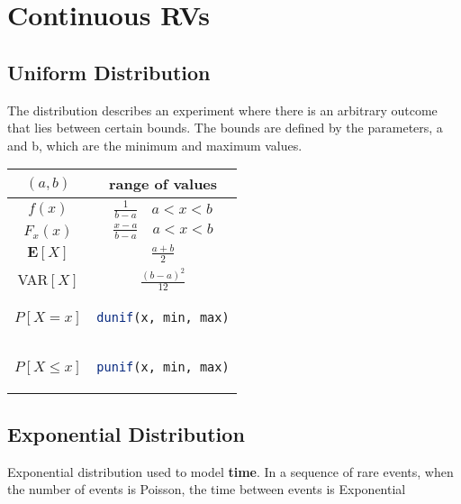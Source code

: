 \chapter{Continuous RVs}
\section{Uniform Distribution}
\begin{tcolorbox}
The distribution describes an experiment where there is an arbitrary outcome that lies between certain bounds. The bounds are defined by the parameters, a and b, which are the minimum and maximum values.
\end{tcolorbox}

\begingroup
\setlength{\tabcolsep}{10pt} %
\renewcommand{\arraystretch}{1.5} %
\begin{center}
\begin{tabular}{ |c|c| } 
\hline
\((a, b)\) & range of values \\ \hline
\(f(x)\) & $\frac{1}{b - a} \quad a < x < b$ \\ \hline
\(F_x(x)\) & $\frac{x - a}{b - a} \quad a < x < b$ \\ \hline
\(\mathbf{E}[X]\) & \(\frac{a + b}{2}\) \\ \hline
VAR\([X]\) & \(\frac{(b - a)^2}{12}\) \\ \hline\hline
\(P[X = x]\) & \begin{lstlisting}[language=R]
dunif(x, min, max)
\end{lstlisting} \\ \hline
\(P[X \leq x]\) & \begin{lstlisting}[language=R]
punif(x, min, max)
\end{lstlisting} \\ \hline
\end{tabular}
\end{center}
\endgroup

\section{Exponential Distribution}
\begin{tcolorbox}
Exponential distribution used to model \textbf{time}. In a sequence of rare events, when the number of events is Poisson, the time between events is Exponential
\end{tcolorbox}

